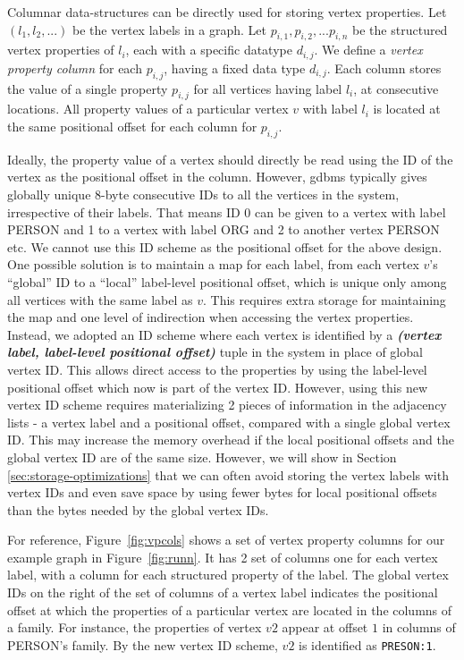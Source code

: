 Columnar data-structures can be directly used for storing vertex properties. Let $(l_1, l_2, ...)$ be the vertex labels in a graph. Let $p_{i,1},  p_{i,2}, ... p_{i, n}$ be the structured vertex properties of $l_i$, each with a specific datatype $d_{i,j}$. We define a \emph{vertex property column} for each $p_{i,j}$, having a fixed data type $d_{i,j}$. Each column stores the value of a single property $p_{i,j}$ for all vertices having label $l_i$, at consecutive locations. All property values of a particular vertex $v$ with label $l_i$ is located at the same positional offset for each column for $p_{i,j}$. 


Ideally, the property value of a vertex should directly be read using the ID of the vertex as the positional offset in the column. However, \gls{gdbms} typically gives globally unique 8-byte consecutive IDs to all the vertices in the system, irrespective of their labels. That means ID 0 can be given to a vertex with label PERSON and 1 to a vertex with label ORG and 2 to another vertex PERSON etc. We cannot use this ID scheme as the positional offset for the above design. One possible solution is to maintain a map for each label, from each vertex $v$'s \enquote{global} ID to a \enquote{local} label-level positional offset, which is unique only among all vertices with the same label as $v$. This requires extra storage for maintaining the map and one level of indirection when accessing the vertex properties. Instead, we adopted an ID scheme where each vertex is identified by a \emph{\textbf{(vertex label, label-level positional offset)}} tuple in the system in place of global vertex ID. This allows direct access to the properties by using the label-level positional offset which now is part of the vertex ID. However, using this new vertex ID scheme requires materializing 2 pieces of information in the adjacency lists - a vertex label and a positional offset, compared with a single global vertex ID. This may increase the memory overhead if the local positional offsets and the global vertex ID are of the same size. However, we will show in Section \ref{sec:storage-optimizations} that we can often avoid storing the vertex labels with vertex IDs and even save space by using fewer bytes for local positional offsets than the bytes needed by the global vertex IDs.

For reference, Figure~\ref{fig:vpcols} shows a set of vertex property columns for our example graph in Figure~\ref{fig:runn}. It has 2 set of columns one for each vertex label, with a column for each structured property of the label. The global vertex IDs on the right of the set of columns of a vertex label indicates the positional offset at which the properties of a particular vertex are located in the columns of a family. For instance, the properties of vertex $v2$ appear at offset $1$ in columns of PERSON's family. By the new vertex ID scheme, $v2$ is identified as \texttt{PRESON:1}. 

